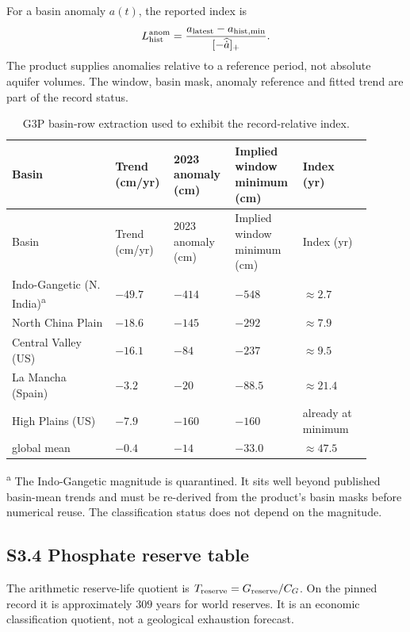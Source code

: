\documentclass[11pt]{article}
\begin{document}
For a basin anomaly $a(t)$, the reported index is
\begin{equation}
L_{\rm hist}^{\rm anom}=
\frac{a_{\rm latest}-a_{\rm hist,min}}{[-\widehat{\dot a}]_+}.
\end{equation}
The product supplies anomalies relative to a reference period, not absolute aquifer volumes. The window, basin mask, anomaly reference and fitted trend are part of the record status.

\begin{longtable}{@{}P{0.27\linewidth}P{0.13\linewidth}P{0.15\linewidth}P{0.17\linewidth}P{0.18\linewidth}@{}}
\caption{G3P basin-row extraction used to exhibit the record-relative index.}\label{tab:g3p}\\
\toprule
Basin & Trend (cm/yr) & 2023 anomaly (cm) & Implied window minimum (cm) & Index (yr) \\
\midrule
\endfirsthead
\toprule
Basin & Trend (cm/yr) & 2023 anomaly (cm) & Implied window minimum (cm) & Index (yr) \\
\midrule
\endhead
\bottomrule
\endfoot
Indo-Gangetic (N. India)\textsuperscript{a} & $-49.7$ & $-414$ & $-548$ & $\approx2.7$ \\
North China Plain & $-18.6$ & $-145$ & $-292$ & $\approx7.9$ \\
Central Valley (US) & $-16.1$ & $-84$ & $-237$ & $\approx9.5$ \\
La Mancha (Spain) & $-3.2$ & $-20$ & $-88.5$ & $\approx21.4$ \\
High Plains (US) & $-7.9$ & $-160$ & $-160$ & already at minimum \\
global mean & $-0.4$ & $-14$ & $-33.0$ & $\approx47.5$ \\
\end{longtable}

\textsuperscript{a} The Indo-Gangetic magnitude is quarantined. It sits well beyond published basin-mean trends and must be re-derived from the product's basin masks before numerical reuse. The classification status does not depend on the magnitude.

\subsection*{S3.4 Phosphate reserve table}

The arithmetic reserve-life quotient is $T_{\rm reserve}=G_{\rm reserve}/C_G$. On the pinned record it is approximately $309$ years for world reserves. It is an economic classification quotient, not a geological exhaustion forecast.
\end{document}
